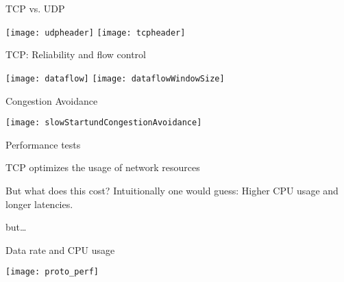 \begin{frame}{TCP vs. UDP}{}
	\begin{center} 
		\texttt{[image: udpheader]}
		\texttt{[image: tcpheader]}
	\end{center} 
\end{frame}

\begin{frame}{TCP: Reliability and flow control}{}
	\begin{center} 
		\texttt{[image: dataflow]}
	\hspace{50}
		\texttt{[image: dataflowWindowSize]}
	\end{center} 
\end{frame}

\begin{frame}{Congestion Avoidance}{}
	\begin{center} 
		\texttt{[image: slowStartundCongestionAvoidance]}
	\end{center} 
\end{frame}

\begin{frame}{Performance tests}{}
	\begin{block}{}
		\vspace{-0.35cm}
		\begin{ergo}
			TCP optimizes the usage of network resources
		\end{ergo}
	\end{block}
	\begin{alertblock}{But what does this cost? }
		Intuitionally one would guess: Higher CPU usage and longer latencies.
	\end{alertblock}
	but\ldots
\end{frame}

\begin{frame}{Data rate and CPU usage}{}
	\begin{center} 
		\texttt{[image: proto\_perf]}
	\end{center} 
\end{frame}

